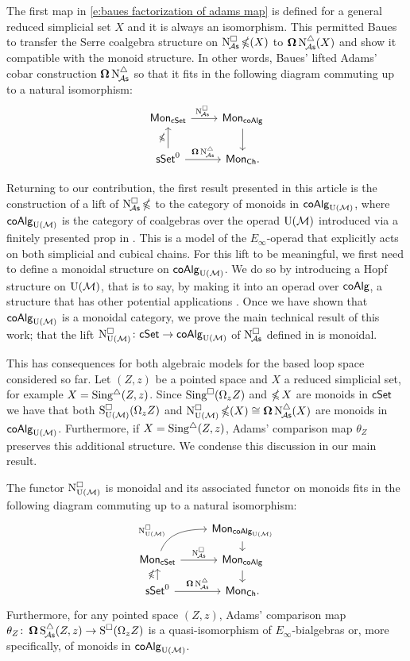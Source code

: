 The first map in \eqref{e:baues factorization of adams map} is defined for a general reduced simplicial set $X$ and it is always an isomorphism.
This permitted Baues to transfer the Serre coalgebra structure on $\operatorname{N^{\square}_{\!{\mathcal{A}\mathsf{s}}}} \operatorname{\mathbb{\Omega}}(X)$ to $\operatorname{\mathbf{\Omega}} \operatorname{N^{\triangle}_{\!{\mathcal{A}\mathsf{s}}}}(X)$ and show it compatible with the monoid structure.
In other words, Baues' lifted Adams' cobar construction $\operatorname{\mathbf{\Omega}} \operatorname{N^{\triangle}_{\!{\mathcal{A}\mathsf{s}}}}$ so that it fits in the following diagram commuting up to a natural isomorphism:
\[
\begin{tikzcd}
\Mon_{\cSet} \arrow[r, "\cchainsA \ "] & \Mon_{\coAlg} \arrow[d] \\
\sSet^0 \arrow[r, "\cobar \schainsA"] \arrow[u, "\ccobar"] & \Mon_{\Ch}.
\end{tikzcd}
\]

Returning to our contribution, the first result presented in this article is the construction of a lift of $\operatorname{N^{\square}_{\!{\mathcal{A}\mathsf{s}}}} \operatorname{\mathbb{\Omega}}$ to the category of monoids in $\mathsf{coAlg}_{\operatorname{U}(\mathcal{M})}$, where $\mathsf{coAlg}_{\operatorname{U}(\mathcal{M})}$ is the category of coalgebras over the operad ${\operatorname{U}(\mathcal{M})}$ introduced via a finitely presented prop in \cite{medina2020prop1}.
This is a model of the $E_\infty$-operad that explicitly acts on both simplicial and cubical chains.
For this lift to be meaningful, we first need to define a monoidal structure on $\mathsf{coAlg}_{\operatorname{U}(\mathcal{M})}$.
We do so by introducing a Hopf structure on ${\operatorname{U}(\mathcal{M})}$, that is to say, by making it into an operad over $\mathsf{coAlg}$, a structure that has other potential applications \cite{livernet2008hopf}.
Once we have shown that $\mathsf{coAlg}_{\operatorname{U}(\mathcal{M})}$ is a monoidal category, we prove the main technical result of this work; that the lift $\operatorname{N^{\square}_{{\operatorname{U}(\mathcal{M})}}} \colon \mathsf{cSet} \to \mathsf{coAlg}_{\operatorname{U}(\mathcal{M})}$ of $\operatorname{N^{\square}_{\!{\mathcal{A}\mathsf{s}}}}$ defined in \cite{medina2021cubical} is monoidal.

This has consequences for both algebraic models for the based loop space considered so far.
Let $(Z,z)$ be a pointed space and $X$ a reduced simplicial set, for example $X = \operatorname{Sing^{\triangle}}(Z,z)$.
Since $\operatorname{Sing^{\square}}(\Omega_z Z)$ and $\operatorname{\mathbb{\Omega}} X$ are monoids in $\mathsf{cSet}$ we have that both $\operatorname{S^{\square}_{{\operatorname{U}(\mathcal{M})}}}(\Omega_z Z)$ and $\operatorname{N^{\square}_{{\operatorname{U}(\mathcal{M})}}} \operatorname{\mathbb{\Omega}}(X) \cong \operatorname{\mathbf{\Omega}} \operatorname{N^{\triangle}_{\!{\mathcal{A}\mathsf{s}}}}(X)$ are monoids in $\mathsf{coAlg}_{\operatorname{U}(\mathcal{M})}$.
Furthermore, if $X = \operatorname{Sing^{\triangle}}(Z,z)$, Adams' comparison map $\theta_Z$ preserves this additional structure.
We condense this discussion in our main result.

\begin{theorem} \label{t:1st main thm in the intro}
	The functor $\operatorname{N^{\square}_{{\operatorname{U}(\mathcal{M})}}}$ is monoidal and its associated functor on monoids fits in the following diagram commuting up to a natural isomorphism:
	\[
	\begin{tikzcd} [row sep=small]
	& \Mon_{\coAlg_\UM} \arrow[d] \\
	\Mon_{\cSet} \arrow[ru, "\cchainsUM", out=70, in=180, near start] \arrow[r, "\cchainsA"]
	& \Mon_{\coAlg} \arrow[d] \\
	\sSet^0 \arrow[r, "\cobar \schainsA"] \arrow[u, "\ccobar"]
	& \Mon_{\Ch}.
	\end{tikzcd}
	\]
Furthermore, for any pointed space $(Z,z)$, Adams' comparison map $\theta_Z \colon \operatorname{\mathbf{\Omega}} \operatorname{S^{\triangle}_{\!{\mathcal{A}\mathsf{s}}}}(Z,z) \to \operatorname{S^{\square}}(\Omega_z Z)$ is a quasi-isomorphism of $E_{\infty}$-bialgebras or, more specifically, of monoids in $\mathsf{coAlg}_{\operatorname{U}(\mathcal{M})}$.
\end{theorem}

